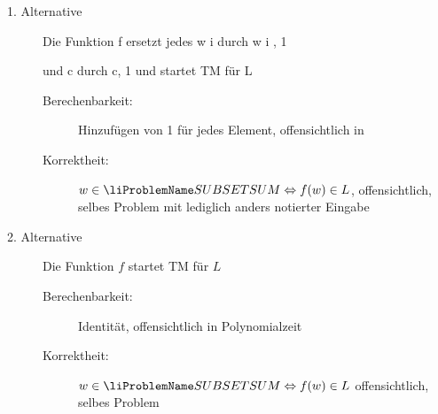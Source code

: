 \documentclass{lehramt-informatik-aufgabe}
\begin{document}
\begin{enumerate}
\begin{liAntwort}
\begin{description}
%

\item[1. Alternative]

Die Funktion f ersetzt jedes w i durch w i , 1

und c durch c, 1 und startet TM für L

\begin{description}
\item[Berechenbarkeit:]

Hinzufügen von 1
für jedes Element, offensichtlich in

\item[Korrektheit:]

$w \in \ssp \Leftrightarrow f (w) \in L$, offensichtlich, selbes Problem
mit lediglich anders notierter Eingabe
\end{description}

%

\item[2. Alternative]

Die Funktion $f$ startet TM für $L$

\begin{description}
\item[Berechenbarkeit:]

Identität, offensichtlich in Polynomialzeit

\item[Korrektheit:]

$w \in \ssp \Leftrightarrow f (w) \in L$ offensichtlich, selbes Problem

\end{description}

\end{description}
\end{liAntwort}

\end{enumerate}
\end{document}
